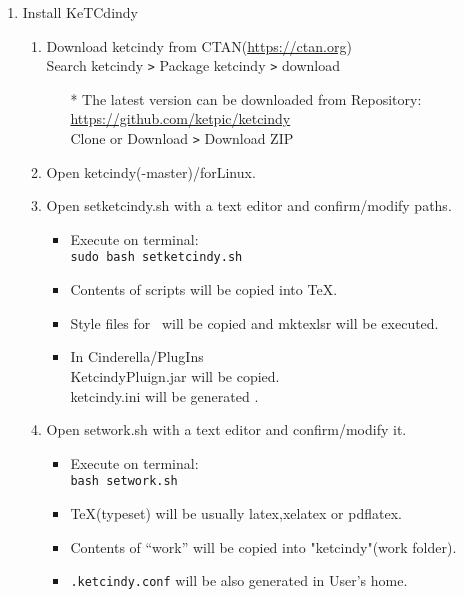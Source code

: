 \documentclass{article}
\begin{document}
\begin{enumerate}[\bf\large 1.]
\item Install KeTCdindy
  \begin{enumerate}[(1)]
  \item Download ketcindy from CTAN(\url{https://ctan.org})\\
  \hspace*{10mm}Search ketcindy \verb|>| Pack­age ketcindy \verb|>| download
    \begin{itemize}
    \item[*]The latest version can be downloaded from Repository:\\
        \hspace*{5mm}\url{https://github.com/ket­pic/ketcindy}\\
        \hspace*{10mm}Clone or Download \verb|>| Download ZIP
    \end{itemize}
  \item Open ketcindy(-master)/forLinux.
  \item Open setketcindy.sh with a text editor and confirm/modify paths.
    \begin{itemize}
    \item Execute on terminal:\\
    \hspace*{10mm}\verb|sudo bash setketcindy.sh|
    \item Contents of scripts will be copied into TeX.
    \item Style files for \ketcindy\ will be copied and mktexlsr will be executed.
    \item In Cinderella/PlugIns\\
    \hspace*{5mm}KetcindyPluign.jar will be copied.\\
    \hspace*{5mm}ketcindy.ini will be generated .
    \end{itemize}
  \item Open setwork.sh with a text editor and confirm/modify it.
    \begin{itemize}
    \item Execute on terminal:\\
    \hspace*{10mm}\verb|bash setwork.sh|
    \item TeX(typeset) will be usually latex,xelatex or pdflatex.
    \item Contents of “work” will be copied into "ketcindy"(work folder).
    \item \verb|.ketcindy.conf| will be also generated in User's home.\\

\end{itemize}
\end{enumerate}
\end{enumerate}
\end{document}
